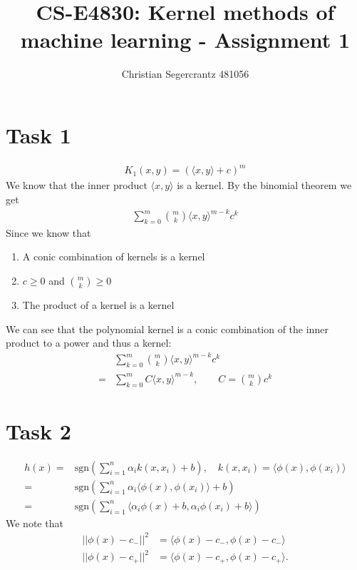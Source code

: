 \documentclass{article}
\title{CS-E4830: Kernel methods of machine learning - Assignment 1}
\author{Christian Segercrantz 481056}
\begin{document}
	\maketitle
	\pagebreak
\section*{Task 1}
\begin{align}
	K_1(x,y) = (\langle x,y \rangle+c)^m
\end{align}
We know that the inner product $\langle x,y \rangle$ is a kernel. By the binomial theorem we get 
\begin{align}
	\sum_{k=0}^{m} {m \choose k} \langle x,y \rangle^{m-k}c^k
\end{align}
Since we know that 
\begin{enumerate}
	\item A conic combination of kernels is a kernel
	\item $c\geq 0$ and ${m \choose k} \geq 0$
	\item The product of a kernel is a kernel
\end{enumerate}
We can see that the polynomial kernel is a conic combination of the inner product to a power and thus a kernel: 
\begin{align}
	&\sum_{k=0}^{m} {m \choose k} \langle x,y \rangle^{m-k}c^k \\
	=& \sum_{k=0}^{m} C \langle x,y \rangle^{m-k}, \qquad C= {m \choose k}c^k 
\end{align}

\section*{Task 2}
\begin{align}
	h(x) =& \text{sgn}\left( \sum_{i = 1}^{n} \alpha_i k(x,x_i) + b\right), \quad k(x,x_i) = \langle \phi(x), \phi(x_i)\rangle \\
	=& \text{sgn}\left( \sum_{i = 1}^{n} \alpha_i \langle \phi(x), \phi(x_i)\rangle + b\right) \\
	=& \text{sgn}\left( \sum_{i = 1}^{n}  \langle \alpha_i\phi(x)+ b, \alpha_i\phi(x_i)+ b\rangle \right)
\end{align}
We note that 
\begin{align}
	||\phi(x) - c_-||^2 &= \langle \phi(x) - c_-, \phi(x) - c_- \rangle \\
	||\phi(x) - c_+||^2 &= \langle \phi(x) - c_+, \phi(x) - c_+ \rangle.
\end{align}
\end{document}
